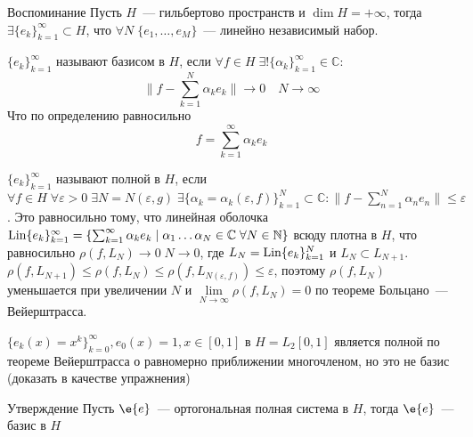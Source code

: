 \documentclass[14pt]{extarticle}
\begin{document}
\begin{MathCl}{Воспоминание}
    Пусть $H$~--- гильбертово пространств и $\dim H = +\infty$, тогда 
    $\exists \{e_k\}_{k = 1}^\infty \subset H$, что $\forall N\; \{e_1,\dots,e_M\}$~--- линейно
    независимый набор.
\end{MathCl}
\begin{Opr}
    $\{e_k\}_{k = 1}^\infty$ называют базисом в $H$, если $\forall f \in H\;\exists!\{\alpha_
    k\}_{k = 1}^\infty \in \mathbb C\colon$
    $$
    \|f - \sum_{k = 1}^N \alpha_k e_k\| \to 0 \quad N \to \infty 
    $$
    Что по определению равносильно
    $$
    f = \sum_{k = 1}^\infty \alpha_k e_k
    $$
\end{Opr}
\begin{Opr}
    $\{e_k\}_{k = 1}^\infty$ называют полной в  $H$, если $\forall f \in H\; \forall \varepsilon
    > 0\;\exists N = N(\varepsilon, g)\; \exists \{\alpha_k = \alpha_k(\varepsilon, f)\}_{k = 1}^N
    \subset \mathbb C\colon \|f - \sum_{n = 1}^N \alpha_n e_n\| \le \varepsilon$.
    Это равносильно тому, что линейная оболочка $\operatorname{Lin}\{e_k\}_{k = 1}^\infty = \{\sum_{k = 
    1}^\infty \alpha_k e_k \mid \alpha_1 \dots \alpha_N \in \mathbb C\; \forall N \in \mathbb 
    N\}$ всюду плотна в $H$, что равносильно $\rho(f, L_N) \to 0\;N \to 0$, где $L_N = 
    \operatorname{Lin}\{e_k\}_{k = 1}^N$ и $L_N \subset L_{N + 1}$.
    $\rho(f, L_{N + 1}) \le \rho(f, L_N) \le \rho(f, L_{N(\varepsilon, f)}) \le \varepsilon$, поэтому
    $\rho(f, L_N)$ уменьшается при увеличении $N$ и $\lim \limits_{N \to \infty} \rho(f, 
    L_N) = 0$ по теореме Больцано~--- Вейерштрасса.
\end{Opr}
\begin{Prim}
    $\{e_k(x) = x^k\}_{k = 0}^\infty, e_0(x) = 1, x\in [0,1]$ в $H = L_2[0,1]$ является полной
    по теореме Вейерштрасса о равномерно приближении многочленом, но это не
    базис (доказать в качестве упражнения)
\end{Prim}
\begin{MathCl}{Утверждение}
    Пусть $\e{e}$~--- ортогональная полная система в $H$, тогда $\e{e}$~--- базис в $H$
\end{MathCl}
\end{document}
